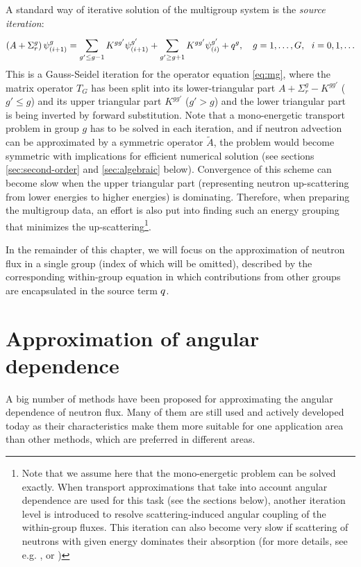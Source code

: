 A standard way of iterative solution of the multigroup system is the \textit{source iteration}:
$$
  \left(A + \Sigma_r^g\right)\psi^g_{(i+1)} = \sum_{g'\leq g-1}^{} K^{gg'}\psi^{g'}_{(i+1)} + \sum_{g' \geq g+1}^{}
  K^{gg'}\psi^{g'}_{(i)} + q^g,\quad g = 1,\ldots,G,\ \ i = 0,1,\ldots
$$ This is a Gauss-Seidel iteration for the operator equation \eqref{eq:mg}, where the matrix operator $T_G$ has been
split into its lower-triangular part $A + \Sigma_r^g - K^{gg'}$ ($g'\leq g$) and its upper triangular part $K^{gg'}$
($g'> g$) and the lower triangular part is being inverted by forward substitution.
Note that a mono-energetic transport problem in group $g$ has to be solved in each iteration, and if neutron advection
can be approximated by a symmetric operator $\tilde A$, the problem would become symmetric with implications for
efficient numerical solution (see sections \ref{sec:second-order} and \ref{sec:algebraic} below). Convergence of this 
scheme can become slow when the upper triangular part (representing neutron up-scattering from lower energies to 
higher energies) is dominating. Therefore, when preparing the multigroup data, an effort is also put into finding
such an energy grouping that minimizes the up-scattering\footnote{Note that we assume here that the mono-energetic
problem can be solved exactly. When transport approximations that take into account angular dependence are used for
this task (see the sections below), another iteration level is introduced to resolve scattering-induced angular coupling
of the within-group fluxes. This iteration can also become very slow if scattering of neutrons with given energy dominates
their absorption (for more details, see e.g. \cite[Chap. 1]{Azmy1}, or \cite[Sec. VII.A]{Adams})}.

In the remainder
of this chapter, we will focus on the approximation of neutron flux in a single
group (index of which will be omitted), described by the corresponding within-group equation in which contributions from
other groups are encapsulated in the source term $q$.

\section{Approximation of angular dependence}

A big number of methods have been proposed for approximating the angular dependence of neutron
flux. Many of them are still used and actively developed today as their characteristics make them more suitable for one
application area than other methods, which are preferred in different areas.

